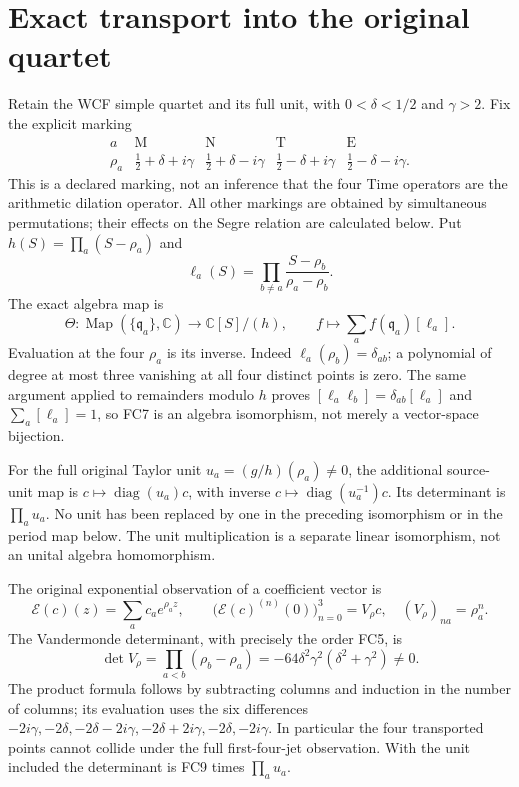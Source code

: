 \documentclass[11pt]{article}
\newcommand{\C}{\mathbb C}
\newcommand{\diag}{\operatorname{diag}}
\begin{document}
\section{Exact transport into the original quartet}
Retain the WCF simple quartet and its full unit, with
$0<\delta<1/2$ and $\gamma>2$. Fix the explicit marking
\[
 \begin{array}{c|cccc}
 a&\mathrm M&\mathrm N&\mathrm T&\mathrm E\\\hline
 \rho_a&\frac12+\delta+i\gamma&\frac12+\delta-i\gamma&
 \frac12-\delta+i\gamma&\frac12-\delta-i\gamma.
 \end{array}
 \tag{FC5}
\]
This is a declared marking, not an inference that the four Time operators
are the arithmetic dilation operator. All other markings are obtained
by simultaneous permutations; their effects on the Segre relation are
calculated below. Put $h(S)=\prod_a(S-\rho_a)$ and
\[
 \ell_a(S)=\prod_{b\ne a}\frac{S-\rho_b}{\rho_a-\rho_b}.
 \tag{FC6}
\]
The exact algebra map is
\[
 \Theta:\operatorname{Map}(\{\mathfrak q_a\},\C)
 \longrightarrow\C[S]/(h),\qquad
 f\longmapsto\sum_a f(\mathfrak q_a)[\ell_a].
 \tag{FC7}
\]
Evaluation at the four $\rho_a$ is its inverse. Indeed
$\ell_a(\rho_b)=\delta_{ab}$; a polynomial of degree at most three
vanishing at all four distinct points is zero. The same argument applied
to remainders modulo $h$ proves
$[\ell_a\ell_b]=\delta_{ab}[\ell_a]$ and
$\sum_a[\ell_a]=1$, so FC7 is an algebra isomorphism, not merely a
vector-space bijection.

For the full original Taylor unit $u_a=(g/h)(\rho_a)\ne0$, the
additional source-unit map is $c\mapsto\diag(u_a)c$, with inverse
$c\mapsto\diag(u_a^{-1})c$. Its determinant is $\prod_a u_a$.
No unit has been replaced by one in the preceding isomorphism or in
the period map below. The unit multiplication is a separate linear
isomorphism, not an unital algebra homomorphism.

The original exponential observation of a coefficient vector is
\[
 \mathcal E(c)(z)=\sum_a c_a e^{\rho_a z},\qquad
 \bigl(\mathcal E(c)^{(n)}(0)\bigr)_{n=0}^3
 =V_\rho c,\quad (V_\rho)_{na}=\rho_a^n.
 \tag{FC8}
\]
The Vandermonde determinant, with precisely the order FC5, is
\[
 \det V_\rho=\prod_{a<b}(\rho_b-\rho_a)
 =-64\delta^2\gamma^2(\delta^2+\gamma^2)\ne0.
 \tag{FC9}
\]
The product formula follows by subtracting columns and induction in the
number of columns; its evaluation uses the six differences
$-2i\gamma,-2\delta,-2\delta-2i\gamma,
-2\delta+2i\gamma,-2\delta,-2i\gamma$.
In particular the four transported points cannot collide under the full
first-four-jet observation. With the unit included the determinant is
FC9 times $\prod_a u_a$.
\end{document}

